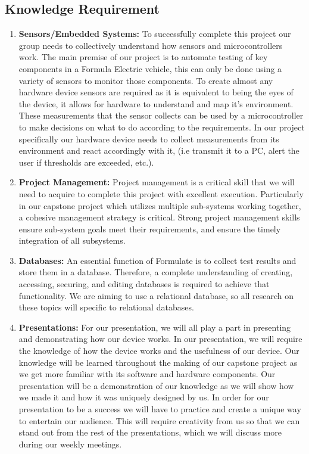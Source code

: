 \documentclass[12pt]{article}
\begin{document}
\subsection{Knowledge Requirement}
\begin{enumerate}
  \item \textbf{Sensors/Embedded Systems:} To successfully complete this project our group needs to collectively understand how sensors and microcontrollers work. The main premise of our project is to automate testing of key components in a Formula Electric vehicle, this can only be done using a variety of sensors to monitor those components. To create almost any hardware device sensors are required as it is equivalent to being the eyes of the device, it allows for hardware to understand and map it's environment. These measurements that the sensor collects can be used by a microcontroller to make decisions on what to do according to the requirements. In our project specifically our hardware device needs to collect measurements from its environment and react accordingly with it, (i.e transmit it to a PC, alert the user if thresholds are exceeded, etc.).
  
  \item \textbf{Project Management:} Project management is a critical skill that we will need to acquire to complete this project with excellent execution. Particularly in our capstone project which utilizes multiple sub-systems working together, a cohesive management strategy is critical. Strong project management skills ensure sub-system goals meet their requirements, and ensure the timely integration of all subsystems.
  
  \item \textbf{Databases:} An essential function of Formulate is to collect test results and store them in a database. Therefore, a complete understanding of creating, accessing, securing, and editing databases is required to achieve that functionality. We are aiming to use a relational database, so all research on these topics will specific to relational databases.
  
  \item \textbf{Presentations:} For our presentation, we will all play a part in presenting and demonstrating how our device works. In our presentation, we will require the knowledge of how the device works and the usefulness of our device. Our knowledge will be learned throughout the making of our capstone project as we get more familiar with its software and hardware components. Our presentation will be a demonstration of our knowledge as we will show how we made it and how it was uniquely designed by us. In order for our presentation to be a success we will have to practice and create a unique way to entertain our audience. This will require creativity from us so that we can stand out from the rest of the presentations, which we will discuss more during our weekly meetings.
  
\end{enumerate}
\end{document}

